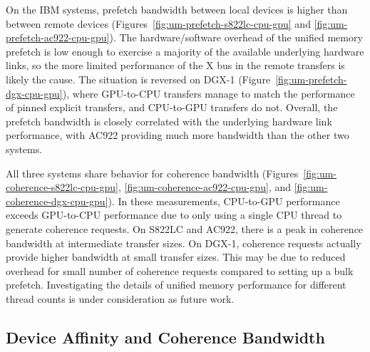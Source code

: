 On the IBM systems, prefetch bandwidth between local devices is higher than between remote devices (Figures~\ref{fig:um-prefetch-s822lc-cpu-gpu} and \ref{fig:um-prefetch-ac922-cpu-gpu}).
The hardware/software overhead of the unified memory prefetch is low enough to exercise a majority of the available underlying hardware links, so the more limited performance of the X bus in the remote transfers is likely the cause.
The situation is reversed on DGX-1 (Figure~\ref{fig:um-prefetch-dgx-cpu-gpu}), where GPU-to-CPU transfers manage to match the performance of pinned explicit transfers, and CPU-to-GPU transfers do not.
Overall, the prefetch bandwidth is closely correlated with the underlying hardware link performance, with AC922 providing much more bandwidth than the other two systems.

All three systems share behavior for coherence bandwidth (Figures~\ref{fig:um-coherence-s822lc-cpu-gpu}, \ref{fig:um-coherence-ac922-cpu-gpu}, and \ref{fig:um-coherence-dgx-cpu-gpu}).
In these measurements, CPU-to-GPU performance exceeds GPU-to-CPU performance due to only using a single CPU thread to generate coherence requests.
On S822LC and AC922, there is a peak in coherence bandwidth at intermediate transfer sizes.
On DGX-1, coherence requests actually provide higher bandwidth at small transfer sizes.
This may be due to reduced overhead for small number of coherence requests compared to setting up a bulk prefetch.
Investigating the details of unified memory performance for different thread counts is under consideration as future work.

\subsection{Device Affinity and Coherence Bandwidth}

